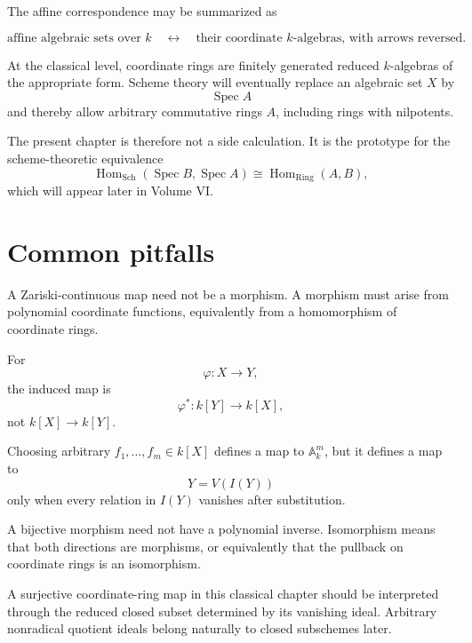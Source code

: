 The affine correspondence may be summarized as

\[
\boxed{
\text{affine algebraic sets over }k
\quad\longleftrightarrow\quad
\text{their coordinate }k\text{-algebras, with arrows reversed}.
}
\]

At the classical level, coordinate rings are finitely generated reduced \(k\)-algebras of
the appropriate form.  Scheme theory will eventually replace an algebraic set \(X\) by
\[
\operatorname{Spec}A
\]
and thereby allow arbitrary commutative rings \(A\), including rings with nilpotents.

The present chapter is therefore not a side calculation.  It is the prototype for the
scheme-theoretic equivalence
\[
\operatorname{Hom}_{\mathrm{Sch}}
(\operatorname{Spec}B,\operatorname{Spec}A)
\cong
\operatorname{Hom}_{\mathrm{Ring}}(A,B),
\]
which will appear later in Volume VI.

\section{Common pitfalls}

\begin{warning}
A Zariski-continuous map need not be a morphism.  A morphism must arise from polynomial
coordinate functions, equivalently from a homomorphism of coordinate rings.
\end{warning}

\begin{warning}
For
\[
\varphi:X\to Y,
\]
the induced map is
\[
\varphi^\ast:k[Y]\to k[X],
\]
not \(k[X]\to k[Y]\).
\end{warning}

\begin{warning}
Choosing arbitrary \(f_1,\dots,f_m\in k[X]\) defines a map to
\(\mathbb A_k^m\), but it defines a map to
\[
Y=V(I(Y))
\]
only when every relation in \(I(Y)\) vanishes after substitution.
\end{warning}

\begin{warning}
A bijective morphism need not have a polynomial inverse.  Isomorphism means that both
directions are morphisms, or equivalently that the pullback on coordinate rings is an
isomorphism.
\end{warning}

\begin{warning}
A surjective coordinate-ring map in this classical chapter should be interpreted through
the reduced closed subset determined by its vanishing ideal.  Arbitrary nonradical quotient
ideals belong naturally to closed subschemes later.
\end{warning}

